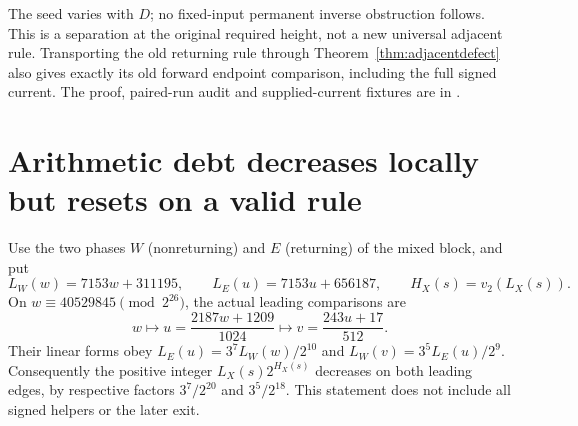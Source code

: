 \documentclass[11pt]{article}
\begin{document}
The seed varies with $D$; no fixed-input permanent inverse obstruction
follows. This is a separation at the original required height, not a
new universal adjacent rule. Transporting the old returning rule through
Theorem~\ref{thm:adjacentdefect} also gives exactly its old forward
endpoint comparison, including the full signed current. The proof,
paired-run audit and supplied-current fixtures are in
.

\section{Arithmetic debt decreases locally but resets on a valid rule}
\label{sec:valuationdebt}
Use the two phases $W$ (nonreturning) and $E$ (returning) of the mixed
block, and put
\[
 L_W(w)=7153w+311195,\qquad L_E(u)=7153u+656187,
 \qquad H_X(s)=v_2(L_X(s)).
\]
On $w\equiv40529845\pmod {2^{26}}$, the actual leading comparisons are
\[
 w\longmapsto u=\frac{2187w+1209}{1024}
 \longmapsto v=\frac{243u+17}{512}.
\]
Their linear forms obey $L_E(u)=3^7L_W(w)/2^{10}$ and
$L_W(v)=3^5L_E(u)/2^9$. Consequently the positive integer
$L_X(s)2^{H_X(s)}$ decreases on both leading edges, by respective factors
$3^7/2^{20}$ and $3^5/2^{18}$. This statement does not include all signed
helpers or the later exit.
\end{document}
